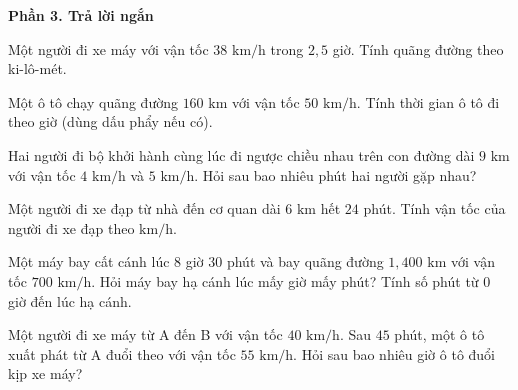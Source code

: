 \textbf{Phần 3. Trả lời ngắn}

\begin{ex} %
Một người đi xe máy với vận tốc $38\text{ km/h}$ trong $2{,}5$ giờ. Tính quãng đường theo ki-lô-mét.
\end{ex}

\begin{ex} %
Một ô tô chạy quãng đường $160\text{ km}$ với vận tốc $50\text{ km/h}$. Tính thời gian ô tô đi theo giờ (dùng dấu phẩy nếu có).
\end{ex}

\begin{ex} %
Hai người đi bộ khởi hành cùng lúc đi ngược chiều nhau trên con đường dài $9\text{ km}$ với vận tốc $4\text{ km/h}$ và $5\text{ km/h}$. Hỏi sau bao nhiêu phút hai người gặp nhau?
\end{ex}

\begin{ex} %
Một người đi xe đạp từ nhà đến cơ quan dài $6\text{ km}$ hết $24$ phút. Tính vận tốc của người đi xe đạp theo $\text{km/h}$.
\end{ex}

\begin{ex} %
Một máy bay cất cánh lúc $8$ giờ $30$ phút và bay quãng đường $1,400\text{ km}$ với vận tốc $700\text{ km/h}$. Hỏi máy bay hạ cánh lúc mấy giờ mấy phút? Tính số phút từ $0$ giờ đến lúc hạ cánh.
\end{ex}

\begin{ex} %
Một người đi xe máy từ A đến B với vận tốc $40\text{ km/h}$. Sau $45$ phút, một ô tô xuất phát từ A đuổi theo với vận tốc $55\text{ km/h}$. Hỏi sau bao nhiêu giờ ô tô đuổi kịp xe máy?
\end{ex}
